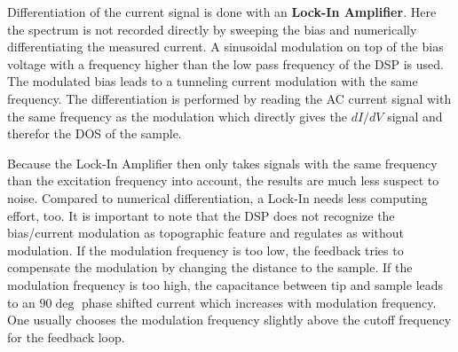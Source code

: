 Differentiation of the current signal is done with an \textbf{Lock-In Amplifier}. Here the spectrum is not recorded directly by sweeping the bias and numerically differentiating the measured current. A sinusoidal modulation on top of the bias voltage with a frequency higher than the low pass frequency of the DSP is used. The modulated bias leads to a tunneling current modulation with the same frequency. The differentiation is performed by reading the AC current signal with the same frequency as the modulation which directly gives the $dI/dV$ signal and therefor the DOS of the sample. 

Because the Lock-In Amplifier then only takes signals with the same frequency than the excitation frequency into account, the results are much less suspect to noise. Compared to numerical differentiation, a Lock-In needs less computing effort, too. It is important to note that the DSP does not recognize the bias/current modulation as topographic feature and regulates as without modulation. If the modulation frequency is too low, the feedback tries to compensate the modulation by changing the distance to the sample. If the modulation frequency is too high, the capacitance between tip and sample leads to an $90\deg$ phase shifted current which increases with modulation frequency. One usually chooses the modulation frequency slightly above the cutoff frequency for the feedback loop.


